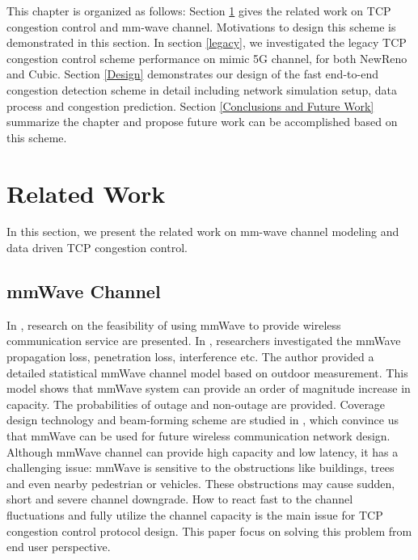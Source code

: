 \par This chapter is organized as follows: Section \ref{Related Work and Motivations} gives the related work on TCP congestion control and mm-wave channel. Motivations to design this scheme is demonstrated in this section. In section \ref{legacy}, we investigated the legacy TCP congestion control scheme performance on mimic 5G channel, for both NewReno and Cubic. Section \ref{Design} demonstrates our design of the fast end-to-end congestion detection scheme in detail including network simulation setup, data process and congestion prediction. Section \ref{Conclusions and Future Work} summarize the chapter and propose future work can be accomplished based on this scheme.

\section{Related Work}
\label{Related Work and Motivations}
In this section, we present the related work on mm-wave channel modeling and data driven TCP congestion control.  
\subsection{mmWave Channel}
\par In \cite{niu2015survey}\cite{rappaport2013millimeter}, research on the feasibility of using mmWave to provide wireless communication service are presented. In \cite{akdeniz2014millimeter}, researchers investigated the mmWave propagation loss, penetration loss, interference etc. The author provided a detailed statistical mmWave channel model based on outdoor measurement. This model shows that mmWave system can provide an order of magnitude increase in capacity. The probabilities of outage and non-outage are provided. Coverage design technology and beam-forming scheme are studied in\cite{sun2014millimeter} \cite{roh2014millimeter}, which convince us that mmWave can be used for future wireless communication network design. Although mmWave channel can provide high capacity and low latency, it has a challenging issue: mmWave is sensitive to the obstructions like buildings, trees and even nearby pedestrian or vehicles. These obstructions may cause sudden, short and severe channel downgrade. How to react fast to the channel fluctuations and fully utilize the channel capacity is the main issue for TCP congestion control protocol design. This paper focus on solving this problem from end user perspective.

